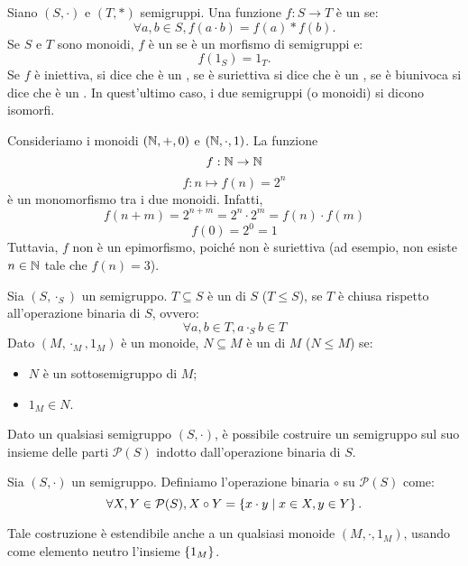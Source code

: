 \begin{definition}
  Siano \((S,\cdot)\) e \((T,*)\) semigruppi.
  Una funzione \(f: S \to T\) è un  se:
  \[\forall a,b \in S, f(a \cdot b) = f(a) * f(b).\]
  Se \(S\) e \(T\) sono monoidi, \(f\) è un  se è un morfismo di semigruppi e:
  \[f(1_S) = 1_T.\]
  Se \(f\) è iniettiva, si dice che è un , se è suriettiva si dice che è un , se è biunivoca si dice che è un .
  In quest'ultimo caso, i due semigruppi (o monoidi) si dicono isomorfi.
\end{definition}
\begin{example}
  Consideriamo i monoidi \((\mathbb{N}, +, 0)\) e \((\mathbb{N}, \cdot, 1)\).
  La funzione 
  \[f: \mathbb{N} \to \mathbb{N}\]
  \[f:n \mapsto f(n) = 2^n\]
  è un monomorfismo tra i due monoidi.
  Infatti,
  \[f(n+m) = 2^{n+m} = 2^n \cdot 2^m = f(n) \cdot f(m)\]
  \[ f(0) = 2^0 = 1\]
  Tuttavia, \(f\) non è un epimorfismo, poiché non è suriettiva (ad esempio, non esiste \(n \in \mathbb{N}\) tale che \(f(n) = 3\)).
\end{example}

\begin{definition}
  Sia \((S,\cdot_S)\) un semigruppo.
  \(T \subseteq S\) è un  di \(S\) (\(T \leq S\)), se \(T\) è chiusa rispetto all'operazione binaria di \(S\), ovvero:
  \[\forall a,b \in T, a \cdot_S b \in T\]
  Dato \((M,\cdot_M,1_M)\) è un monoide, \(N \subseteq M\) è un  di \(M\) (\(N \leq M\)) se:
  \begin{itemize}
    \item \(N\) è un sottosemigruppo di \(M\);
    \item \(1_M \in N\).
  \end{itemize}
\end{definition}

Dato un qualsiasi semigruppo \((S,\cdot)\), è possibile costruire un semigruppo sul suo insieme delle parti \(\mathcal{P}(S)\) indotto dall'operazione binaria di \(S\).
\begin{definition}
  Sia \((S,\cdot)\) un semigruppo.
  Definiamo l'operazione binaria \(\circ\) su \(\mathcal{P}(S)\) come:
  \[\forall X,Y \in \mathcal{P}(S), X \circ Y = \set{x \cdot y}[ x \in X, y \in Y].\]
\end{definition}
Tale costruzione è estendibile anche a un qualsiasi monoide \((M,\cdot,1_M)\), usando come elemento neutro l'insieme \(\set{1_M}\).

